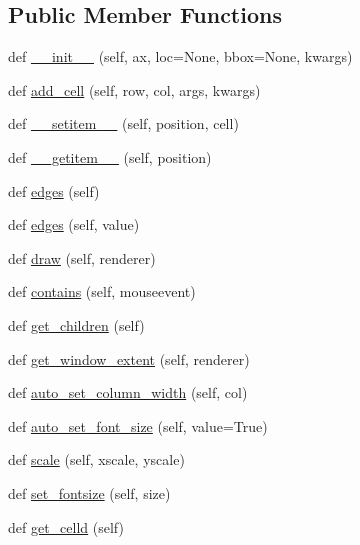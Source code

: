 \subsection*{Public Member Functions}
\begin{DoxyCompactItemize}
\item 
def \hyperlink{classmatplotlib_1_1table_1_1Table_afa7c25d35cad9a3687e65c3cfd55277e}{\+\_\+\+\_\+init\+\_\+\+\_\+} (self, ax, loc=None, bbox=None, kwargs)
\item 
def \hyperlink{classmatplotlib_1_1table_1_1Table_a19bb373b8e28f862486599fd9ad4a204}{add\+\_\+cell} (self, row, col, args, kwargs)
\item 
def \hyperlink{classmatplotlib_1_1table_1_1Table_a8a4e780c757cefd3fc9e5493bab27296}{\+\_\+\+\_\+setitem\+\_\+\+\_\+} (self, position, cell)
\item 
def \hyperlink{classmatplotlib_1_1table_1_1Table_a7b47a53228d1b4a82c375db6d8f2eef4}{\+\_\+\+\_\+getitem\+\_\+\+\_\+} (self, position)
\item 
def \hyperlink{classmatplotlib_1_1table_1_1Table_ae2a754bbeace53c798410dee6f352edc}{edges} (self)
\item 
def \hyperlink{classmatplotlib_1_1table_1_1Table_a1696117165cb9ae0f44d1fd3f393a9f9}{edges} (self, value)
\item 
def \hyperlink{classmatplotlib_1_1table_1_1Table_a8ee722965afc1db25f2c3f9674766124}{draw} (self, renderer)
\item 
def \hyperlink{classmatplotlib_1_1table_1_1Table_afc20e7ccb91ae26751b26f7dccde82fd}{contains} (self, mouseevent)
\item 
def \hyperlink{classmatplotlib_1_1table_1_1Table_a24aed221960a92b7c146a4b965617576}{get\+\_\+children} (self)
\item 
def \hyperlink{classmatplotlib_1_1table_1_1Table_a09614514d4cb83db4c452c9ee48c06b1}{get\+\_\+window\+\_\+extent} (self, renderer)
\item 
def \hyperlink{classmatplotlib_1_1table_1_1Table_a2b5f5358579cf39869ceac03b4b0fd81}{auto\+\_\+set\+\_\+column\+\_\+width} (self, col)
\item 
def \hyperlink{classmatplotlib_1_1table_1_1Table_a0fc7a804b56aed93aaed1514da6fa0c7}{auto\+\_\+set\+\_\+font\+\_\+size} (self, value=True)
\item 
def \hyperlink{classmatplotlib_1_1table_1_1Table_accfb3c665905c34572540e1448fe3376}{scale} (self, xscale, yscale)
\item 
def \hyperlink{classmatplotlib_1_1table_1_1Table_aec049ca1e0ec6c296d57c22600a391fc}{set\+\_\+fontsize} (self, size)
\item 
def \hyperlink{classmatplotlib_1_1table_1_1Table_a8c2a9e7e76f3ae807058106ffe426dc6}{get\+\_\+celld} (self)
\end{DoxyCompactItemize}

